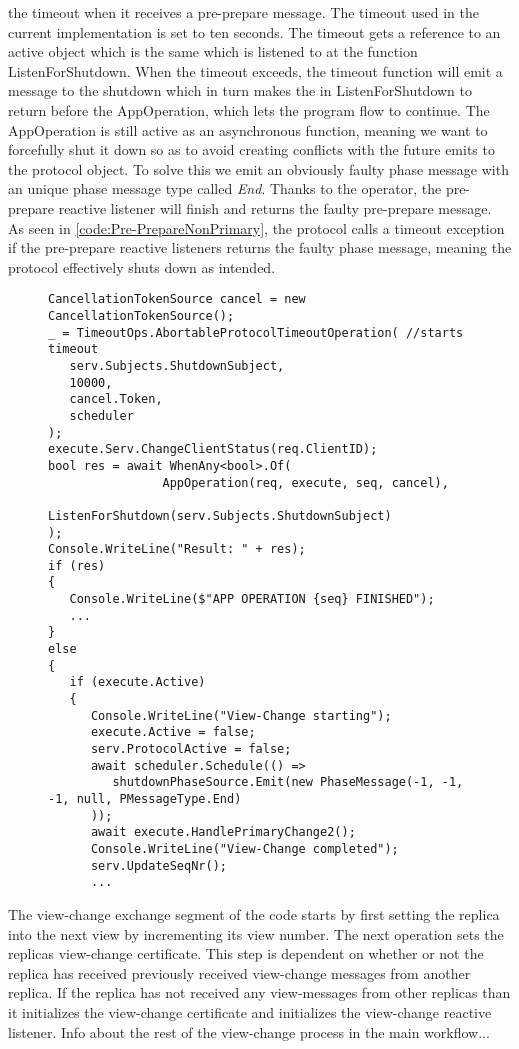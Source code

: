 the timeout when it receives a pre-prepare message. The timeout used in the current implementation is set to ten seconds. The timeout gets a reference to an active  object which is the same  which is listened to at the function ListenForShutdown. When the timeout exceeds, the timeout function will emit a message to the shutdown  which in turn makes the  in ListenForShutdown to return before the AppOperation, which lets the program flow to continue. The AppOperation is still active as an asynchronous function, meaning we want to forcefully shut it down so as to avoid creating conflicts with the future emits to the protocol  object. To solve this we emit an obviously faulty phase message with an unique phase message type called \emph{End}. Thanks to the  operator, the pre-prepare reactive listener will finish and returns the faulty pre-prepare message. As seen in \autoref{code:Pre-PrepareNonPrimary}, the protocol calls a timeout exception if the pre-prepare reactive listeners returns the faulty phase message, meaning the protocol effectively shuts down as intended.   

\begin{figure}[H]
	\centering
	\begin{lstlisting}[label = code:timeout, caption=Handling timeout for the normal protocol workflow, captionpos = b, basicstyle=\scriptsize]
CancellationTokenSource cancel = new CancellationTokenSource();
_ = TimeoutOps.AbortableProtocolTimeoutOperation( //starts timeout
   serv.Subjects.ShutdownSubject,
   10000,
   cancel.Token,
   scheduler
);
execute.Serv.ChangeClientStatus(req.ClientID);
bool res = await WhenAny<bool>.Of(
                AppOperation(req, execute, seq, cancel),
                ListenForShutdown(serv.Subjects.ShutdownSubject)
);
Console.WriteLine("Result: " + res);
if (res)
{
   Console.WriteLine($"APP OPERATION {seq} FINISHED");
   ...
}
else
{
   if (execute.Active)
   {
      Console.WriteLine("View-Change starting");
      execute.Active = false;
      serv.ProtocolActive = false;
      await scheduler.Schedule(() =>
         shutdownPhaseSource.Emit(new PhaseMessage(-1, -1, -1, null, PMessageType.End)
      ));
      await execute.HandlePrimaryChange2(); 
      Console.WriteLine("View-Change completed");
      serv.UpdateSeqNr();
      ...
    \end{lstlisting}
\end{figure} 
 
The view-change exchange segment of the code starts by first setting the replica into the next view by incrementing its view number. The next operation sets the replicas view-change certificate. This step is dependent on whether or not the replica has received previously received view-change messages from another replica. If the replica has not received any view-messages from other replicas than it initializes the view-change certificate and initializes the view-change reactive listener. Info about the rest of the view-change process in the main workflow...

